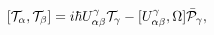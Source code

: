 \begin{equation}
\lbrack{\cal T}_{\alpha},{\cal T}_{\beta}]=i\hbar U_{\alpha\beta
}^{\gamma}{\cal T}_{\gamma}-[U_{\alpha\beta}^{\gamma},\Omega]\bar{\cal
{P}}_{\gamma},\label{2.12}%
\end{equation}%
